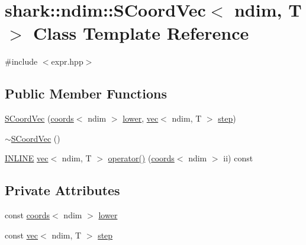 \hypertarget{classshark_1_1ndim_1_1_s_coord_vec}{}\section{shark\+:\+:ndim\+:\+:S\+Coord\+Vec$<$ ndim, T $>$ Class Template Reference}
\label{classshark_1_1ndim_1_1_s_coord_vec}


{\ttfamily \#include $<$expr.\+hpp$>$}

\subsection*{Public Member Functions}
\begin{DoxyCompactItemize}
\item 
\hyperlink{classshark_1_1ndim_1_1_s_coord_vec_a2206234f04728b090829ce9cdb3d0be1}{S\+Coord\+Vec} (\hyperlink{structshark_1_1ndim_1_1coords}{coords}$<$ ndim $>$ \hyperlink{classshark_1_1ndim_1_1_s_coord_vec_aec6b26f59abee649139be7a517101d04}{lower}, \hyperlink{structshark_1_1ndim_1_1vec}{vec}$<$ ndim, T $>$ \hyperlink{classshark_1_1ndim_1_1_s_coord_vec_aa2ce747ed08501f5fe6bf4a8c6b25a20}{step})
\item 
\hyperlink{classshark_1_1ndim_1_1_s_coord_vec_a965693ba29b2ccd952552ea6cd1c5f3e}{$\sim$\+S\+Coord\+Vec} ()
\item 
\hyperlink{common_8hpp_a2eb6f9e0395b47b8d5e3eeae4fe0c116}{I\+N\+L\+I\+NE} \hyperlink{structshark_1_1ndim_1_1vec}{vec}$<$ ndim, T $>$ \hyperlink{classshark_1_1ndim_1_1_s_coord_vec_abad6eb3a4c0fdd994227b8beeee7f86a}{operator()} (\hyperlink{structshark_1_1ndim_1_1coords}{coords}$<$ ndim $>$ ii) const
\end{DoxyCompactItemize}
\subsection*{Private Attributes}
\begin{DoxyCompactItemize}
\item 
const \hyperlink{structshark_1_1ndim_1_1coords}{coords}$<$ ndim $>$ \hyperlink{classshark_1_1ndim_1_1_s_coord_vec_aec6b26f59abee649139be7a517101d04}{lower}
\item 
const \hyperlink{structshark_1_1ndim_1_1vec}{vec}$<$ ndim, T $>$ \hyperlink{classshark_1_1ndim_1_1_s_coord_vec_aa2ce747ed08501f5fe6bf4a8c6b25a20}{step}
\end{DoxyCompactItemize}


